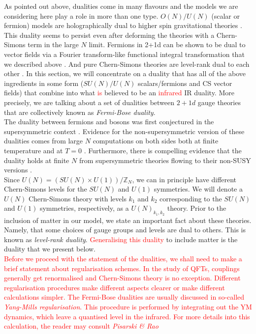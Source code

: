         \indent As pointed out above, dualities come in many flavours and the models we are considering here play a role in more than one type. $O(N)/U(N)$ (scalar or fermion) models are holographically dual to higher spin gravitational theories \cite{Klebanov:2002ja}. This duality seems to persist even after deforming the theories with a Chern-Simons term in the large $N$ limit\cite{Aharony:2011jz}. Fermions in 2+1d can be shown to be dual to vector fields via a Fourier transform-like functional integral transformation that we described above \cite{Burgess:1993np, Barci:1995iy}. And pure Chern-Simons theories are level-rank dual to each other \cite{Naculich:1990pa, Camperi:1990dk, Mlawer:1990uv, Nakanishi:1990hj, Naculich:2007nc}. In this section, we will concentrate on a duality that has all of the above ingredients in some form ($SU(N)/U(N)$ scalars/fermions and CS vector fields) that combine into what \textcolor{red}{is} believed to be an \textcolor{red}{infrared} IR duality. More precisely, we are talking about a set of dualities between $2+1d$ gauge theories that are collectively known as \textit{Fermi-Bose duality}.\\
        \indent The duality between fermions and bosons was first conjectured  in the supersymmetric context \cite{Giveon:2008zn, Benini:2011mf, Aharony:2013dha, Aharony:2014uya}. Evidence for the non-supersymmetric version of these dualities comes from large $N$ computations on both sides both at finite temperature \cite{Aharony:2012ns}  and at $T=0$ \cite{Giombi:2011kc}. Furthermore, there is compelling evidence that the duality holds at finite $N$ from supersymmetric theories flowing to their non-SUSY versions \cite{Jain:2013gza, Gur-Ari:2015pca}.\\
        \indent Since $U(N) = (SU(N)\times U(1))/\mathbb{Z}_N$, we can in principle have different Chern-Simons levels for the $SU(N)$ and $U(1)$ symmetries. We will denote a $U(N)$ Chern-Simons theory with levels $k_1$ and $k_2$ corresponding to the $SU(N)$ and $U(1)$ symmetries, respectively, as a $U(N)_{k_1,k_2}$ theory. Prior to the inclusion of matter in our model, we state an important fact about these theories. Namely, that some choices of gauge groups and levels are dual to others. This is known as \textit{level-rank duality}. \textcolor{red}{Generalising this duality} to include matter is the duality that we present below.\\
\indent \textcolor{red}{Before we proceed with the statement of the dualities, we shall need to make a brief statement about regularisation schemes. In the study of QFTs, couplings generally get renormali\textcolor{red}{s}ed and Chern-Simons theory is no exception. Different regularisation procedures make different aspects clearer or make different calculations simpler. The Fermi-Bose dualities are usually discussed in so-called \textit{Yang-Mills regularisation}. This procedure is performed by integrating out the YM dynamics, which leave a quanti\textcolor{red}{s}ed level in the infrared. For more details into this calculation, the reader may consult \textit{Pisarski \& Rao} \cite{PhysRevD.32.2081}}\\
